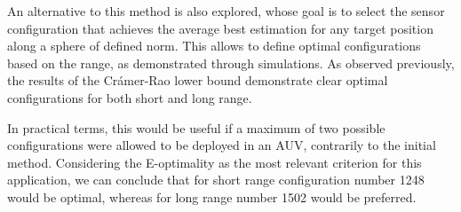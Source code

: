 An alternative to this method is also explored, whose goal is to select the sensor configuration that achieves the average best estimation for any target position along a sphere of defined norm. This allows to define optimal configurations based on the range, as demonstrated through simulations. As observed previously, the results of the Crámer-Rao lower bound demonstrate clear optimal configurations for both short and long range. 

In practical terms, this would be useful if a maximum of two possible configurations were allowed to be deployed in an AUV, contrarily to the initial method. Considering the E-optimality as the most relevant criterion for this application, we can conclude that for short range configuration number 1248 would be optimal, whereas for long range number 1502 would be preferred.
